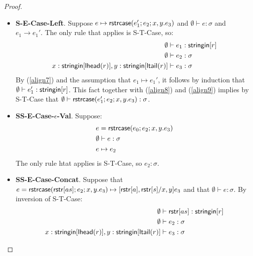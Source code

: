 \documentclass[11pt,leqno]{article}
\theoremstyle{definition}
\newcommand{\stringin}[1]{{\sf stringin}[#1]}
\newcommand{\strcase}[3]{ {\sf rstrcase}(#1; #2; #3)}
\newcommand{\lhead}[1]{ {\sf lhead}(#1) }
\newcommand{\ltail}[1]{ {\sf ltail}(#1) }
\begin{document}
\begin{proof}
\begin{itemize}[label=$ $,itemsep=1ex]
\item \textbf{S-E-Case-Left}.
Suppose 
$e \mapsto \strcase{e_1'}{e_2}{x,y.e_3}$
and $\emptyset \vdash e : \sigma$ and $e_1 \rightarrow e_1'$.
The only rule that applies is S-T-Case, so:
\begin{align}
\emptyset&\vdash e_1 : \stringin{r} \label{align7} \\
\emptyset&\vdash e_2 : \sigma \label{align8} \\ 
x:\stringin{\lhead{r}}, y : \stringin{\ltail{r}} &\vdash e_3 : \sigma \label{align9}
\end{align}
By (\ref{align7}) and the assumption that $e_1 \mapsto e_1'$, it follows by induction that $\emptyset\vdash e_1' : \stringin{r}$.
This fact together with (\ref{align8}) and (\ref{align9}) implies by S-T-Case that
$\emptyset\vdash\strcase{e_1'}{e_2}{x,y.e_3} : \sigma$.


\item \textbf{SS-E-Case-$\epsilon$-Val}.
Suppose: \begin{align*}
&e = \strcase{e_0}{e_2}{x,y.e_3} \\
&\emptyset\vdash e: \sigma \\
&e \mapsto e_2
\end{align*}
The only rule htat applies is S-T-Case, so $e_2 : \sigma$.

\item \textbf{SS-E-Case-Concat}.
Suppose that $e = \strcase{\rstr{as}}{e_2}{x,y.e_3} \mapsto [\rstr{a}, \rstr{s} / x,y] e_3$
and that $\emptyset\vdash e : \sigma$.
By inversion of S-T-Case:
\begin{align}
\emptyset&\vdash \rstr{as} : \stringin{r} \label{align13}\\
\emptyset&\vdash e_2 : \sigma \label{align14} \\ 
x:\stringin{\lhead{r}}, y : \stringin{\ltail{r}} &\vdash e_3 : \sigma \label{align15}
\end{align}


\end{itemize}
\end{proof}
\end{document}
